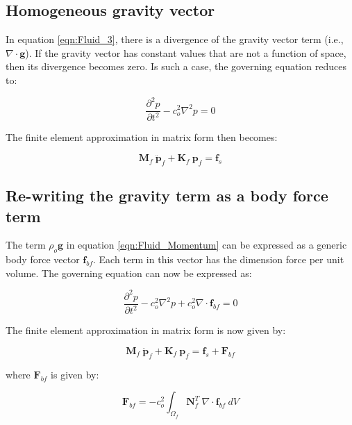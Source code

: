 \documentclass[3p]{elsarticle}
\begin{document}
\subsection{Homogeneous gravity vector}
\vspace{0.2in}
\noindent In equation \eqref{eqn:Fluid_3}, there is a divergence of the gravity vector term (i.e., $\nabla \cdot \mathbf{g}$). If the gravity vector has constant values that are not a function of space, then its divergence becomes zero. Is such a case, the governing equation reduces to:

\begin{equation}
    \label{eqn:Fluid_10}
    \frac{\partial^2 p}{\partial t^2} - c_o^2 \nabla^2p = 0
\end{equation}

\noindent The finite element approximation in matrix form then becomes:

\begin{equation}
    \label{eqn:Fluid_11}
    \mathbf{M}_f~\mathbf{\ddot{p}}_f + \mathbf{K}_f~\mathbf{p}_f = \mathbf{f}_s
\end{equation}

\subsection{Re-writing the gravity term as a body force term}
\vspace{0.2in}
\noindent The term $\rho_o \mathbf{g}$ in equation \eqref{eqn:Fluid_Momentum} can be expressed as a generic body force vector $\mathbf{f}_{bf}$. Each term in this vector has the dimension force per unit volume. The governing equation can now be expressed as:

\begin{equation}
    \label{eqn:Fluid_12}
    \frac{\partial^2 p}{\partial t^2} - c_o^2 \nabla^2p + c_o^2 \nabla \cdot \mathbf{f}_{bf} = 0
\end{equation}

\noindent The finite element approximation in matrix form is now given by:

\begin{equation}
    \label{eqn:Fluid_13}
    \mathbf{M}_f~\mathbf{\ddot{p}}_f + \mathbf{K}_f~\mathbf{p}_f = \mathbf{f}_s + \mathbf{F}_{bf}
\end{equation}

\noindent where $\mathbf{F}_{bf}$ is given by:

\begin{equation}
    \label{eqn:Fluid_14}
    \mathbf{F}_{bf} = -c_o^2 \int_{\Omega_f} \mathbf{N}_f^T~\nabla \cdot \mathbf{f}_{bf}~dV
\end{equation}
\end{document}
